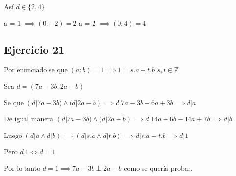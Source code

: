 Así $ d \in \{ 2,4 \}$

a = 1 $ \implies (0:-2) = 2 $
a = 2 $ \implies (0:4) = 4 $

\subsection{Ejercicio 21}
Por enunciado se que $ (a:b) = 1 \implies 1 = s.a + t.b$  $s,t \in \mathbb{Z}$

Sea $ d = (7a-3b:2a-b) $

Se que $ (d| 7a-3b) \wedge (d|2a-b) \implies d|7a-3b-6a+3b \implies d|a $

De igual manera $ (d| 7a-3b) \wedge (d|2a-b) \implies d|14a-6b-14a+7b \implies d|b $

Luego $ (d|a \wedge d|b) \implies (d|s.a \wedge d|t.b) \implies d|s.a + t.b \implies d|1$

Pero $ d|1 \iff d=1 $

Por lo tanto $ d=1 \implies 7a-3b \perp 2a-b $ como se quería probar.


